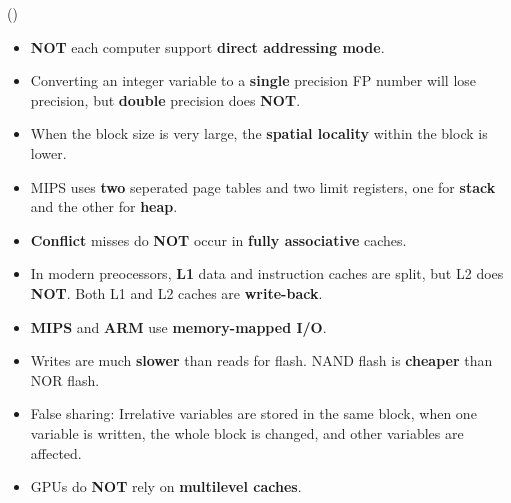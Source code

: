 \begin{theorem}{()}
\begin{itemize}
        \item \textbf{NOT} each computer support \textbf{direct addressing mode}.
        \item Converting an integer variable to a \textbf{single} precision FP number will lose precision, but \textbf{double} precision does \textbf{NOT}.
        \item When the block size is very large, the \textbf{spatial locality} within the block is lower.
        \item MIPS uses \textbf{two} seperated page tables and two limit registers, one for \textbf{stack} and the other for \textbf{heap}.
        \item \textbf{Conflict} misses do \textbf{NOT} occur in \textbf{fully associative} caches.
        \item In modern preocessors, \textbf{L1} data and instruction caches are split, but L2 does \textbf{NOT}. Both L1 and L2 caches are \textbf{write-back}.
        \item \textbf{MIPS} and \textbf{ARM} use \textbf{memory-mapped I/O}.
        \item Writes are much \textbf{slower} than reads for flash. NAND flash is \textbf{cheaper} than NOR flash.
        \item False sharing: Irrelative variables are stored in the same block, when one variable is written, the whole block is changed, and other variables are affected.
        \item GPUs do \textbf{NOT} rely on \textbf{multilevel caches}.
    \end{itemize}
\end{theorem}
